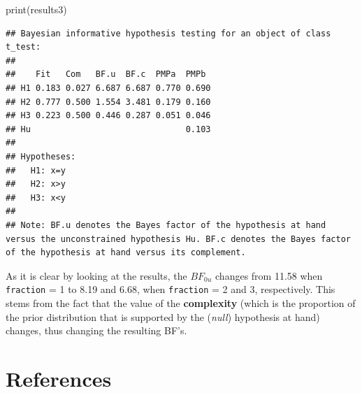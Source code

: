 \documentclass[
]{book}
\newenvironment{Shaded}{\begin{snugshade}}{\end{snugshade}}
\newcommand{\FunctionTok}[1]{\textcolor[rgb]{0.00,0.00,0.00}{#1}}
\newcommand{\NormalTok}[1]{#1}
\begin{document}
\begin{Shaded}
\begin{Highlighting}[]
\FunctionTok{print}\NormalTok{(results3)}
\end{Highlighting}
\end{Shaded}

\begin{verbatim}
## Bayesian informative hypothesis testing for an object of class t_test:
## 
##    Fit   Com   BF.u  BF.c  PMPa  PMPb 
## H1 0.183 0.027 6.687 6.687 0.770 0.690
## H2 0.777 0.500 1.554 3.481 0.179 0.160
## H3 0.223 0.500 0.446 0.287 0.051 0.046
## Hu                               0.103
## 
## Hypotheses:
##   H1: x=y
##   H2: x>y
##   H3: x<y
## 
## Note: BF.u denotes the Bayes factor of the hypothesis at hand versus the unconstrained hypothesis Hu. BF.c denotes the Bayes factor of the hypothesis at hand versus its complement.
\end{verbatim}

As it is clear by looking at the results, the \(BF_{0u}\) changes from 11.58 when \texttt{fraction} = 1 to 8.19 and 6.68, when \texttt{fraction} = 2 and 3, respectively. This stems from the fact that the value of the \textbf{complexity} (which is the proportion of the prior distribution that is supported by the (\emph{null}) hypothesis at hand) changes, thus changing the resulting BF's.

\hypertarget{references}{%
\chapter*{References}\label{references}}
\end{document}
